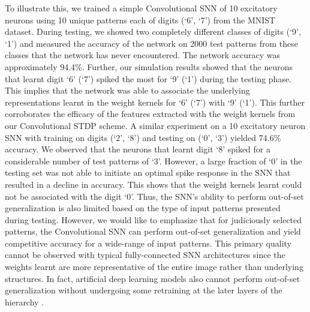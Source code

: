 \documentclass[journal, onecolumn]{IEEEtran}
\begin{document}
To illustrate this, we trained a simple Convolutional SNN of 10 excitatory neurons using 10 unique patterns each of digits (`6', `7') from the MNIST dataset. During testing, we showed two completely different classes of digits (`9', `1') and measured the accuracy of the network on 2000 test patterns from these classes that the network has never encountered. The network accuracy was approximately 94.4\%. Further, our simulation results showed that the neurons that learnt digit `6' (`7') spiked the most for `9' (`1') during the testing phase. This implies that the network was able to associate the underlying representations learnt in the weight kernels for `6' (`7') with `9' (`1'). This further corroborates the efficacy of the features extracted with the weight kernels from our Convolutional STDP scheme. A similar experiment on a 10 excitatory neuron SNN with training on digits (`2', `8') and testing on (`0', `3') yielded 74.6\% accuracy. We observed that the neurons that learnt digit `8' spiked for a considerable number of test patterns of `3'. However, a large fraction of `0' in the testing set was not able to initiate an optimal spike response in the SNN that resulted in a decline in accuracy. This shows that the weight kernels learnt could not be associated with the digit `0'.  Thus, the SNN’s ability to perform out-of-set generalization is also limited based on the type of input patterns presented during testing. However, we would like to emphasize that for judiciously selected patterns, the Convolutional SNN can perform out-of-set generalization and yield competitive accuracy for a wide-range of input patterns. This primary quality cannot be observed with typical fully-connected SNN architectures since the weights learnt are more representative of the entire image rather than underlying structures. In fact, artificial deep learning models also cannot perform out-of-set generalization without undergoing some retraining at the later layers of the hierarchy \cite{scheirer2014probability}. 
\end{document}

